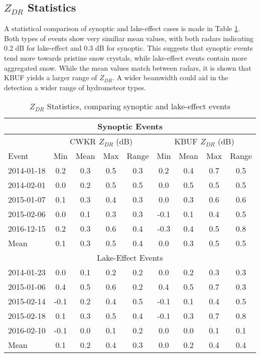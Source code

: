 \subsection{$Z_{DR}$ Statistics}
A statistical comparison of synoptic and lake-effect cases is made in Table \ref{eventcompare}. Both types of events show very similiar mean values, with both radars indicating 0.2 dB for lake-effect and 0.3 dB for synoptic. This suggests that synoptic events tend more towards pristine snow crystals, while lake-effect events contain more aggregated snow. While the mean values match between radars, it is shown that KBUF yields a larger range of $Z_{DR}$. A wider beamwidth could aid in the detection a wider range of hydrometeor types.
\begin{table}[h]
    \caption{$Z_{DR}$ Statistics, comparing synoptic and lake-effect events}\label{eventcompare}
    \begin{center}
    \begin{tabular}{|l|c|c|c|c|c|c|c|c|}
    \hline 
    \multicolumn{9}{|c|}{Synoptic Events} \\
    \hline
     &
    \multicolumn{4}{|c|}{CWKR $Z_{DR}$ (dB)} &
    \multicolumn{4}{|c|}{KBUF $Z_{DR}$ (dB)} \\
    \hline
     Event & Min & Mean & Max & Range & Min & Mean & Max & Range\\
    \hline\hline
    2014-01-18 & 0.2 & 0.3 & 0.5 & 0.3 & 0.2 & 0.4 & 0.7 & 0.5 \\
    \hline
    2014-02-01 & 0.0 & 0.2 & 0.5 & 0.5  & 0.0 & 0.5 & 0.5 & 0.5 \\    
    \hline
    2015-01-07 & 0.1 & 0.3 & 0.4 & 0.3 & 0.0 & 0.3 & 0.6 & 0.6 \\ 
    \hline
    2015-02-06 & 0.0 & 0.1 & 0.3 & 0.3 & -0.1 & 0.1 & 0.4 & 0.5\\
    \hline
    2016-12-15 & 0.2 & 0.3 & 0.6 & 0.4 & -0.3 & 0.4 & 0.5 & 0.8  \\ 
    \hline 
    Mean  & 0.1 & 0.3 & 0.5 & 0.4 & 0.0 & 0.3 & 0.5 & 0.5 \\
    \hline
    \multicolumn{9}{|c|}{Lake-Effect Events} \\
    \hline\hline
    2014-01-23 & 0.0 & 0.1 & 0.2 & 0.2 & 0.0 & 0.2 &0.3 & 0.3\\
    \hline
    2015-01-06  & 0.4 & 0.5 & 0.6  & 0.2 & 0.4 & 0.5 & 0.7 & 0.3 \\
    \hline
    2015-02-14 & -0.1 & 0.2 & 0.4  & 0.5 & -0.1 & 0.1 & 0.4 & 0.5 \\
    \hline
    2015-02-18 & 0.1  & 0.3 & 0.5 & 0.4  & -0.1 & 0.3 & 0.7 & 0.8 \\ 
    \hline
    2016-02-10  & -0.1 & 0.0 & 0.1 & 0.2 &  0.0 & 0.0 & 0.1 & 0.1  \\ 
    \hline\hline
    Mean & 0.1 & 0.2 & 0.4 & 0.3 & 0.0 & 0.2 & 0.4 & 0.4  \\
    \hline
    \end{tabular}
    \end{center}
\end{table}

